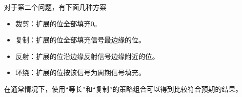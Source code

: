 对于第二个问题，有下面几种方案
\begin{itemize}
    \item 裁剪：扩展的位全部填充$0$。
    \item 复制：扩展的位全部填充信号最边缘的位。
    \item 反射：扩展的位沿边缘反射信号边缘附近的位。
    \item 环绕：扩展的位按该信号为周期信号填充。
\end{itemize}

在通常情况下，使用“等长”和“复制”的策略组合可以得到比较符合预期的结果。